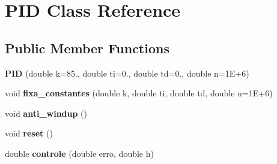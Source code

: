 \hypertarget{classPID}{}\section{P\+ID Class Reference}
\label{classPID}
\subsection*{Public Member Functions}
\begin{DoxyCompactItemize}
\item 
{\bfseries P\+ID} (double k=85., double ti=0., double td=0., double n=1\+E+6)\hypertarget{classPID_a30315612ae1a3da4d98f6c1fa50e81a8}{}\label{classPID_a30315612ae1a3da4d98f6c1fa50e81a8}

\item 
void {\bfseries fixa\+\_\+constantes} (double k, double ti, double td, double n=1\+E+6)\hypertarget{classPID_ad37a3ec6d948b01a0321438fbe6a5e5f}{}\label{classPID_ad37a3ec6d948b01a0321438fbe6a5e5f}

\item 
void {\bfseries anti\+\_\+windup} ()\hypertarget{classPID_ad3744e219dfc951b56539d61ef011258}{}\label{classPID_ad3744e219dfc951b56539d61ef011258}

\item 
void {\bfseries reset} ()\hypertarget{classPID_af9677e76cb1beffbcf3f54cbc627c530}{}\label{classPID_af9677e76cb1beffbcf3f54cbc627c530}

\item 
double {\bfseries controle} (double erro, double h)\hypertarget{classPID_af4ffe73f6d9c7fafe3e509a1bcfe000f}{}\label{classPID_af4ffe73f6d9c7fafe3e509a1bcfe000f}

\end{DoxyCompactItemize}
